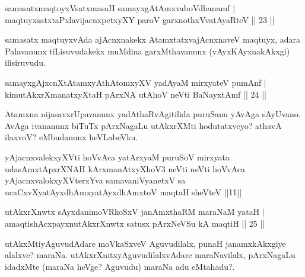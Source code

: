 
\begin{shl}
samasatxmaqtoyxVsatxmasaH samayxgAtAmxvaboVdhanamf |\\
maqtuyxsatxtaPxlavijacnxpetxyXY paroV garxnothxV\s vatAyaRteV \hfill || 23 ||
\end{shl}

\begin{artha}
samasatx maqtuyxvAda ajAcnxnakekx AtamxtatxvajAcnxnaveV maqtuyx, adara Palavanunx tiLisuvudakekx muMdina garxMthavanunx (vAyxKAyxnakAkxgi) ilisiruvudu.
\end{artha}


\begin{shl}
samayxgAjxcnXtAtamxyAthAtomxyXV yadA\s yaM mirxyateV pumAnf |\\
kimutAkxrXmanatxyXtaH pArxNA utAhoV neVti BaNayxtAmf \hfill || 24 ||
\end{shl}

\begin{artha}
Atamxna nijasavxrUpavanunx yadAthaRvAgitilida puruSanu yAvAga sAyUvano. AvAga ivananunx 
biTuTx pArxNagaLu utAkxrXMti hodutatxveyo? athavA ilaxvoV? eMbudanunx heVLabeVku.
\end{artha}


\begin{shl}
yAjacnxvalekxyXVti hoVvAca yatArxyaM puruSoV mirxyata udasAmxtApxrXNAH kArxmanAtxyXhoV3 neVti neVti hoVvAca yAjacnxvalokxyXV\s terxYva samavaniVyanetxV sa ucaCxvXyatAyxdhAmxyatAyxdhAmxtoV maqtaH sheVteV ||11||
\end{shl}


\begin{shl}
utAkxrXnwtx sAyxdanimoVRkoSxV janAmxthaRM maraNaM yataH |\\
amaqtishAcxpayxnutAkxrXnwtx satusx pArxNeVSu kA maqtiH \hfill || 25 ||
\end{shl}

\begin{artha}
utAkxMtiyAguvudAdare moVkaSxveV Aguvudilalx, punaH janamxkAkxgiye alalxve? maraNa. 
utAkxrXnitxyAguvudilalxvAdare maraNavilalx, pArxNagaLu idadxMte (maraNa heVge? Aguvudu) 
maraNa adu eMtahadu?.
\end{artha}

